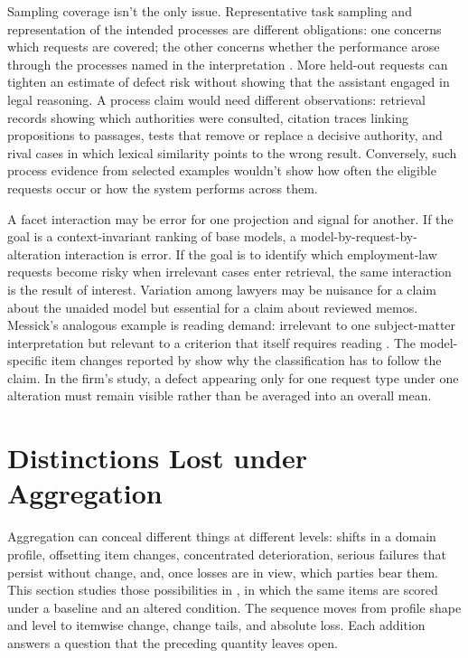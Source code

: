 \documentclass[12pt]{article}
\begin{document}
Sampling coverage isn't the only issue. Representative task sampling and representation of the intended processes are different obligations: one concerns which requests are covered; the other concerns whether the performance arose through the processes named in the interpretation \citep[745]{messick1995Validity}. More held-out requests can tighten an estimate of defect risk without showing that the assistant engaged in legal reasoning. A process claim would need different observations: retrieval records showing which authorities were consulted, citation traces linking propositions to passages, tests that remove or replace a decisive authority, and rival cases in which lexical similarity points to the wrong result. Conversely, such process evidence from selected examples wouldn't show how often the eligible requests occur or how the system performs across them.

A facet interaction may be error for one projection and signal for another. If the goal is a context-invariant ranking of base models, a model-by-request-by-alteration interaction is error. If the goal is to identify which employment-law requests become risky when irrelevant cases enter retrieval, the same interaction is the result of interest. Variation among lawyers may be nuisance for a claim about the unaided model but essential for a claim about reviewed memos. Messick's analogous example is reading demand: irrelevant to one subject-matter interpretation but relevant to a criterion that itself requires reading \citep[743]{messick1995Validity}. The model-specific item changes reported by \textcite[2, 4--6]{zhang2026illusionRobustness} show why the classification has to follow the claim. In the firm's study, a defect appearing only for one request type under one alteration must remain visible rather than be averaged into an overall mean.

\section{Distinctions Lost under Aggregation}\label{sec:profile}

Aggregation can conceal different things at different levels: shifts in a domain profile, offsetting item changes, concentrated deterioration, serious failures that persist without change, and, once losses are in view, which parties bear them. This section studies those possibilities in , in which the same items are scored under a baseline and an altered condition. The sequence moves from profile shape and level to itemwise change, change tails, and absolute loss. Each addition answers a question that the preceding quantity leaves open.
\end{document}
